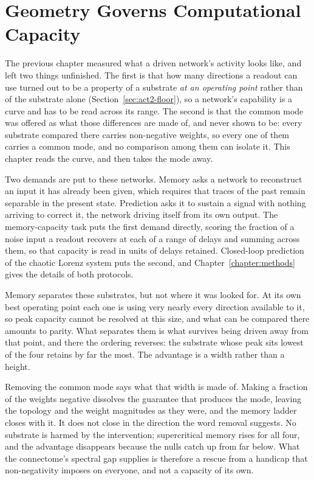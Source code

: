 \chapter{Geometry Governs Computational Capacity}
\label{chapter:act-III}


The previous chapter measured what a driven network's activity looks like, and
left two things unfinished. The first is that how many directions a readout can
use turned out to be a property of a substrate \emph{at an operating point}
rather than of the substrate alone (Section~\ref{sec:act2-floor}), so a
network's capability is a curve and has to be read across its range. The second
is that the common mode was offered as what those differences are made of, and
never shown to be: every substrate compared there carries non-negative weights,
so every one of them carries a common mode, and no comparison among them can
isolate it. This
chapter reads the curve, and then takes the mode away.

Two demands are put to these networks. Memory asks a network to reconstruct an
input it has already been given, which requires that traces of the past remain
separable in the present state. Prediction asks it to sustain a signal with
nothing arriving to correct it, the network driving itself from its own output.
The memory-capacity task puts the first demand directly, scoring the fraction of
a noise input a readout recovers at each of a range of delays and summing across
them, so that capacity is read in units of delays retained. Closed-loop
prediction of the chaotic Lorenz system puts the second, and
Chapter~\ref{chapter:methods} gives the details of both protocols.

Memory separates these substrates, but not where it was looked for. At its own
best operating point each one is using very nearly every direction available to
it, so peak capacity cannot be resolved at this size, and what can be compared
there amounts to parity. What separates them is what survives being driven away
from that point, and there the ordering reverses: the substrate whose peak sits
lowest of the four retains by far the most. The advantage is a width rather than
a height.

Removing the common mode says what that width is made of. Making a fraction of
the weights negative dissolves the guarantee that produces the mode, leaving the
topology and the weight magnitudes as they were, and the memory ladder closes
with it. It does not close in the direction the word removal suggests. No
substrate is harmed by the intervention; supercritical memory rises for all four,
and the advantage disappears because the nulls catch up from far below. What the
connectome's spectral gap supplies is therefore a rescue from a handicap that
non-negativity imposes on everyone, and not a capacity of its own.

